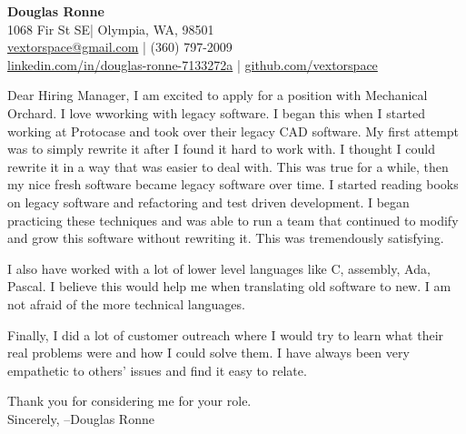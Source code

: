 \documentclass[letter,12pt]{article}
\begin{document}
\begin{center}
    {\Huge \textbf{Douglas Ronne}}\\
    \vspace{2mm}
    1068 Fir St SE| Olympia, WA, 98501\\
    \href{mailto:vextorspace@gmail.com}{vextorspace@gmail.com} | (360) 797-2009\\
    \href{www.linkedin.com/in/douglas-ronne-7133272a}{linkedin.com/in/douglas-ronne-7133272a} | \href{https://github.com/vextorspace}{github.com/vextorspace}
\end{center}

Dear Hiring Manager,
I am excited to apply for a position with Mechanical Orchard. I love wworking with legacy software. I began this when I started working at Protocase and took over their legacy CAD software. My first attempt was to simply rewrite it after I found it hard to work with. I thought I could rewrite it in a way that was easier to deal with. This was true for a while, then my nice fresh software became legacy software over time. I started reading books on legacy software and refactoring and test driven development. I began practicing these techniques and was able to run a team that continued to modify and grow this software without rewriting it. This was tremendously satisfying.

I also have worked with a lot of lower level languages like C, assembly, Ada, Pascal. I believe this would help me when translating old software to new. I am not afraid of the more technical languages.

Finally, I did a lot of customer outreach where I would try to learn what their real problems were and how I could solve them. I have always been very empathetic to others' issues and find it easy to relate.

Thank you for considering me for your role.
\\
Sincerely,
--Douglas Ronne
\end{document}
